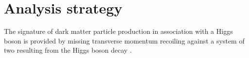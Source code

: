 \begin{table}[htbp]
\caption{List of the signal and background processes with the MC event generators, sets of PDFs and tunes used for their description in the \(\met + \Hbb\) search.}
\label{tab:monoH:physics:mcsamples:generators}
\centering
{}
\end{table}


\section{Analysis strategy}
\label{sec:monoH:analysis}
The signature of dark matter particle production in association with a Higgs boson is provided by missing transverse momentum \met recoiling against a system of two \bjets resulting from the Higgs boson decay \HepProcess{\Ph \to \Pqb \Paqb}.

